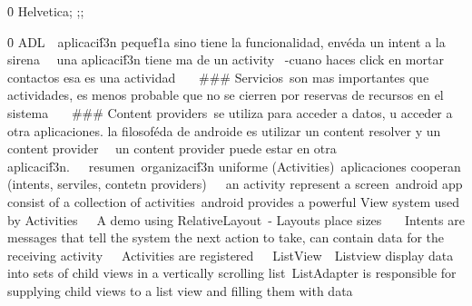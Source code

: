 {\ansi{}
{\fonttbl\f0\fswiss{} Helvetica;}
{;;}
\pard{}\ql\qnatural\pardirnatural

\f0  ADL\
\
aplicaci\'f3n peque\'f1a sino tiene la funcionalidad, env\'eda un intent a la sirena \
\
una aplicaci\'f3n tiene ma de un activity \
	-cuano haces click en mortar contactos esa es una actividad \
\
\
### Servicios\
	son mas importantes que actividades, es menos probable que no se cierren por reservas de recursos en el sistema \
\
\
### Content providers\
	se utiliza para acceder a datos, u acceder a otra aplicaciones. la filosof\'eda de androide es utilizar un content resolver y un content provider \
\
un content provider puede estar en otra aplicaci\'f3n.\
\
\
resumen\
	organizaci\'f3n uniforme (Activities)\
	aplicaciones cooperan (intents, serviles, contetn providers)\
\
\
an activity represent a screen\
android app consist of a collection of activities\
android provides a powerful View system used by Activities\
\
\
A demo using RelativeLayout\
- Layouts place sizes \
\
\
Intents are messages that tell the system the next action to take, can contain data for the receiving activity\
\
\
Activities are registered\
\
\
ListView\
\
Listview display data into sets of child views in a vertically scrolling list\
ListAdapter is responsible for supplying child views to a list view and filling them with data}
